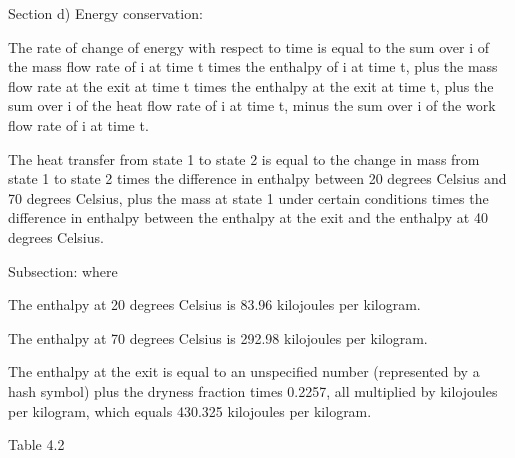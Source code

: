 Section d) Energy conservation:

The rate of change of energy with respect to time is equal to the sum over i of the mass flow rate of i at time t times the enthalpy of i at time t, plus the mass flow rate at the exit at time t times the enthalpy at the exit at time t, plus the sum over i of the heat flow rate of i at time t, minus the sum over i of the work flow rate of i at time t.

The heat transfer from state 1 to state 2 is equal to the change in mass from state 1 to state 2 times the difference in enthalpy between 20 degrees Celsius and 70 degrees Celsius, plus the mass at state 1 under certain conditions times the difference in enthalpy between the enthalpy at the exit and the enthalpy at 40 degrees Celsius.

Subsection: where

The enthalpy at 20 degrees Celsius is 83.96 kilojoules per kilogram.

The enthalpy at 70 degrees Celsius is 292.98 kilojoules per kilogram.

The enthalpy at the exit is equal to an unspecified number (represented by a hash symbol) plus the dryness fraction times 0.2257, all multiplied by kilojoules per kilogram, which equals 430.325 kilojoules per kilogram.

Table 4.2